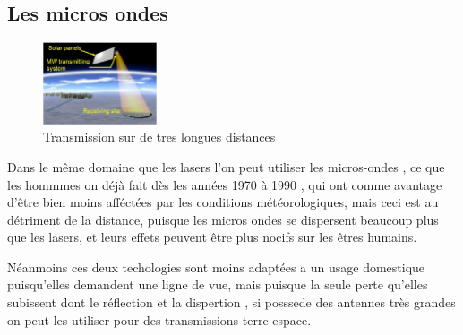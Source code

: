 \documentclass[12pt]{report}
\begin{document}
    \subsection{Les micros ondes}
\begin{figure}
  \begin{center}
    \includegraphics[width=0.3\textwidth]{microwave}
  \end{center}
  \caption{Transmission sur de tres longues distances}
\end{figure}Dans le même domaine que les lasers l'on peut utiliser les micros-ondes , ce que les hommmes on déjà fait dès les années 1970 à 1990 , qui ont comme avantage d'être bien moins afféctées par les conditions météorologiques, mais ceci est au détriment de la distance, puisque les micros ondes se dispersent beaucoup plus que les lasers, et leurs effets peuvent être plus nocifs sur les êtres humains.

  Néanmoins ces deux techologies sont moins adaptées a un usage domestique puisqu'elles demandent une ligne de vue, mais puisque la seule perte qu'elles subissent dont le réflection et la dispertion , si posssede des antennes très grandes on peut les utiliser pour des transmissions terre-espace.
\end{document}
